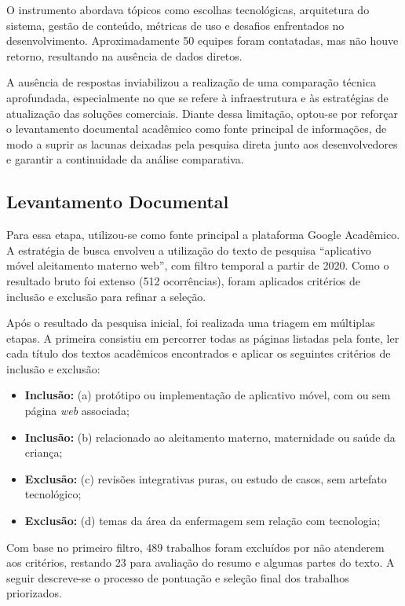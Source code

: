 O instrumento abordava tópicos como escolhas tecnológicas, arquitetura do sistema, gestão de conteúdo, métricas de uso e desafios enfrentados no desenvolvimento. Aproximadamente 50 equipes foram contatadas, mas não houve retorno, resultando na ausência de dados diretos.

A ausência de respostas inviabilizou a realização de uma comparação técnica aprofundada, especialmente no que se refere à infraestrutura e às estratégias de atualização das soluções comerciais. Diante dessa limitação, optou-se por reforçar o levantamento documental acadêmico como fonte principal de informações, de modo a suprir as lacunas deixadas pela pesquisa direta junto aos desenvolvedores e garantir a continuidade da análise comparativa.

\subsection{Levantamento Documental}

Para essa etapa, utilizou-se como fonte principal a plataforma Google Acadêmico. A estratégia de busca envolveu a utilização do texto de pesquisa ``aplicativo móvel aleitamento materno web'', com filtro temporal a partir de 2020. Como o resultado bruto foi extenso (512 ocorrências), foram aplicados critérios de inclusão e exclusão para refinar a seleção.

Após o resultado da pesquisa inicial, foi realizada uma triagem em múltiplas etapas. A primeira consistiu em percorrer todas as páginas listadas pela fonte, ler cada título dos textos acadêmicos encontrados e aplicar os seguintes critérios de inclusão e exclusão:

\begin{itemize}
  \item \textbf{Inclusão:} (a) protótipo ou implementação de aplicativo móvel, com ou sem página \emph{web} associada;
  \item \textbf{Inclusão:} (b) relacionado ao aleitamento materno, maternidade ou saúde da criança;
  \item \textbf{Exclusão:} (c) revisões integrativas puras, ou estudo de casos, sem artefato tecnológico;
  \item \textbf{Exclusão:} (d) temas da área da enfermagem sem relação com tecnologia;
\end{itemize}

Com base no primeiro filtro, 489 trabalhos foram excluídos por não atenderem aos critérios, restando 23 para avaliação do resumo e algumas partes do texto. A seguir descreve-se o processo de pontuação e seleção final dos trabalhos priorizados.

